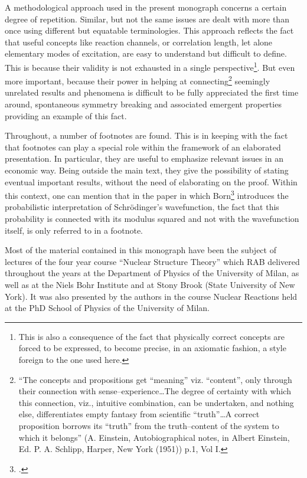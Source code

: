 A methodological approach used in the present monograph concerns a certain degree of repetition. Similar, but not the same issues are dealt with more than once using different but equatable terminologies. This approach reflects the fact that useful concepts like reaction channels, or correlation length, let alone elementary modes of excitation, are easy to understand but difficult to define. This is because their validity is not exhausted in a single perspective\footnote{This is also a consequence of the fact that physically correct concepts are forced to be expressed, to become precise, in an axiomatic fashion, a style foreign to the one used here.}. But even more important, because their power in helping at connecting\footnote{``The concepts and propositions get ``meaning'' viz. ``content'', only through their connection with sense--experience\dots The degree of certainty with which this connection, viz., intuitive combination, can be undertaken, and nothing else, differentiates empty fantasy from scientific ``truth''\dots A correct proposition borrows its ``truth'' from the truth--content of the system to which it belongs'' (A. Einstein, Autobiographical notes, in Albert Einstein, Ed. P. A. Schlipp, Harper, New York (1951)) p.1, Vol I.} seemingly unrelated results and phenomena is difficult to be fully appreciated the first time around, spontaneous symmetry breaking and associated emergent properties providing an example of this fact.


Throughout, a number of footnotes are found. This is in keeping with the fact that footnotes can play a special role within the framework of an elaborated presentation. In particular, they are useful to emphasize relevant issues in an economic way. Being outside the main text, they give the possibility of stating eventual important results, without the need of elaborating on the proof. Within this context, one can mention that in the paper  in which Born\footnote{\cite{Born:26}.} introduces the probabilistic interpretation of Schr\"odinger's  wavefunction, the fact that this probability is connected with its modulus squared and not with the wavefunction itself, is only referred to in a footnote.



  Most of the material contained in this monograph have been the subject of lectures of the four year course ``Nuclear Structure Theory'' which RAB delivered throughout the years at the Department of Physics of the University of Milan, as well as at the Niels Bohr Institute and at Stony Brook (State University of New York). It was also presented by the authors in the course Nuclear Reactions held at the PhD School of Physics of the University of Milan.


